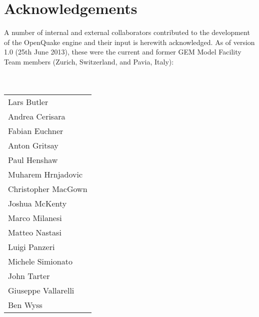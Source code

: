 \chapter*{Acknowledgements}
A number of internal and external collaborators contributed to 
the development of the OpenQuake engine and their input is herewith acknowledged. 
As of version 1.0 (25th June 2013), these were the current and former GEM Model Facility Team members (Zurich, Switzerland,
and Pavia, Italy): \hfill \\
\hfill \\
\hfill \\
\begin{tabular}{l}
Lars Butler \\
Andrea Cerisara \\
Fabian Euchner \\
Anton Gritsay \\
Paul Henshaw \\
Muharem Hrnjadovic \\
Christopher MacGown \\
Joshua McKenty \\
Marco Milanesi \\
Matteo Nastasi \\
Luigi Panzeri \\
Michele Simionato \\
John Tarter \\
Giuseppe Vallarelli \\
Ben Wyss \\
\end{tabular} \hfill \\
%

